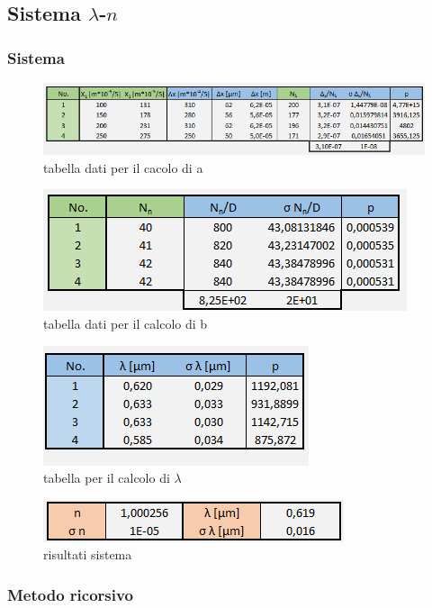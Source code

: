 \documentclass{article}
\begin{document}
\subsection{Sistema $\lambda$-$n$}
\subsubsection{Sistema}

\begin{figure}[h!]
  \centering
  \includegraphics[width=1\linewidth]{IM tabella a}
  \caption{tabella dati per il cacolo di a}
\end{figure}

\begin{figure}[h!]
  \centering
  \includegraphics[width=0.6\linewidth]{IM tabella b}
  \caption{tabella dati per il calcolo di b}
\end{figure}

\begin{figure}[h!]
  \centering
  \includegraphics[width=0.4\linewidth]{IM tabella lambda sistema}
  \caption{tabella per il calcolo di $\lambda$}
\end{figure}

\begin{figure}[h!]
  \centering
  \includegraphics[width=0.6\linewidth]{IM risultati sistema}
  \caption{risultati sistema}
\end{figure}

\subsubsection{Metodo ricorsivo}
\end{document}

